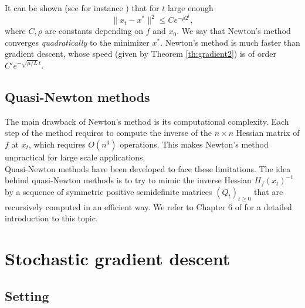 \documentclass[11pt,nocut]{article}
\begin{document}
It can be shown (see for instance \cite{boyd2004convex}) that for $t$ large enough
\begin{equation}\label{eq:newton}
\|x_t - x^* \|^2 \leq C e^{-\rho 2^t},
\end{equation}
where $C,\rho$ are constants depending on $f$ and $x_0$. We say that Newton's method converges \emph{quadratically} to the minimizer $x^*$. Newton's method is much faster than gradient descent, whose speed (given by Theorem \ref{th:gradient2}) is of order $C' e^{-\sqrt{\mu/L} \, t}$.


\subsection{Quasi-Newton methods}

The main drawback of Newton's method is its computational complexity. Each step of the method requires to compute the inverse of the $n \times n$ Hessian matrix of $f$ at $x_t$, which requires $O(n^3)$ operations. This makes Newton's method unpractical for large scale applications.
\\

Quasi-Newton methods have been developed to face these limitations. 
The idea behind quasi-Newton methods is to try to mimic the inverse Hessian $H_f(x_t)^{-1}$ by a sequence of symmetric positive semidefinite matrices $(Q_t)_{t \geq 0}$ that are recursively computed in an efficient way. We refer to Chapter 6 of \cite{nocedal2006numerical} for a detailed introduction to this topic.

\section{Stochastic gradient descent}

\subsection{Setting}
\end{document}
